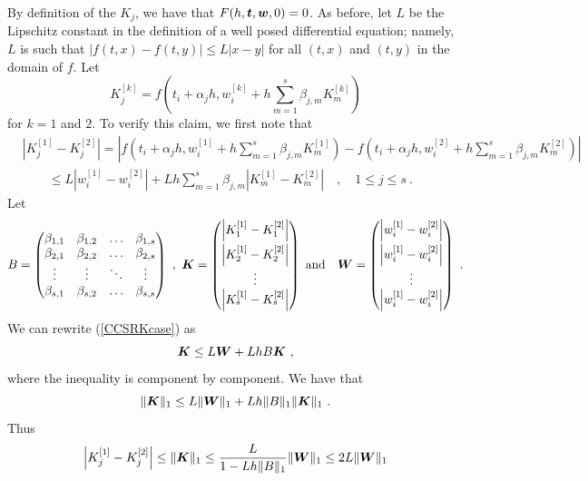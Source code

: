 \begin{enumerate}
By definition of the $K_j$, we have that $F(h,\bm{t},\bm{w},0) = 0$.
As before, let $L$ be the Lipschitz constant in the definition of a well
posed differential  equation; namely, $L$ is such that
$|f(t,x)-f(t,y)| \leq L |x-y|$ for all $(t,x)$ and $(t,y)$ in
the domain of $f$.  Let
\[
K_j^{[k]} = f(t_i + \alpha_j h,
w_i^{[k]} + h \sum_{m=1}^s \beta_{j,m} K_m^{[k]})
\]
for $k=1$ and $2$.  To verify this claim, we first note that
\begin{align}
&\left| K_j^{[1]}  - K_j^{[2]}  \right|
= \left|f(t_i + \alpha_j h,
w_i^{[1]} + h \sum_{m=1}^s \beta_{j,m} K_m^{[1]})
- f(t_i + \alpha_j h,
w_i^{[2]} + h \sum_{m=1}^s \beta_{j,m} K_m^{[2]}) \right| \nonumber \\
&\qquad \leq L \left| w_i^{[1]} - w_i^{[2]} \right|
 + L h \sum_{m=1}^s \beta_{j,m} \left| K_m^{[1]} - K_m^{[2]} \right|
\quad , \quad 1 \leq j \leq s \ . \label{CCSRKcase}
\end{align}
Let
\[
B = \begin{pmatrix} \beta_{1,1} & \beta_{1,2} & \ldots & \beta_{1,s} \\
\beta_{2,1} & \beta_{2,2} & \ldots & \beta_{2,s} \\
\vdots & \vdots & \ddots & \vdots \\
\beta_{s,1} & \beta_{s,2} & \ldots & \beta_{s,s}
\end{pmatrix} \ , \ 
\VEC{K} =
\begin{pmatrix}
\left| K_1^{[1]}  - K_1^{[2]}  \right| \\[0.5em]
\left| K_2^{[1]}  - K_2^{[2]}  \right| \\
\vdots \\
\left| K_s^{[1]}  - K_s^{[2]}  \right|
\end{pmatrix}
\ \text{and} \quad
\VEC{W} =
\begin{pmatrix}
\left| w_i^{[1]}  - w_i^{[2]}  \right| \\[0.5em]
\left| w_i^{[1]}  - w_i^{[2]}  \right| \\
\vdots \\
\left| w_i^{[1]}  - w_i^{[2]}  \right|
\end{pmatrix}
\ .
\]
We can rewrite (\ref{CCSRKcase}) as
\[
  \VEC{K} \leq L\VEC{W} + L h B \VEC{K} \ ,
\]
where the inequality is component by component.
We have that
\[
  \| \bm{K} \|_1 \leq L \|\bm{W}\|_1 + L h \|B\|_1 \|\bm{K}\|_1 \ .
\]
Thus
\begin{align*}
\left| K_j^{[1]}  - K_j^{[2]}  \right|
&\leq \|\VEC{K}\|_1 \leq \frac{L}{1-L h\|B\|_1} \|\VEC{W}\|_1
\leq 2 L \|\VEC{W}\|_1 \\

\end{align*}
\end{enumerate}
